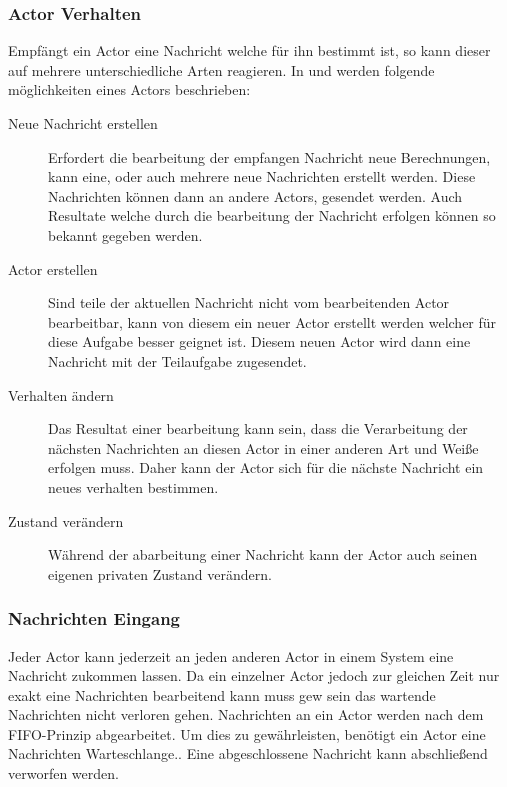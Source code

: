 \subsubsection{Actor Verhalten}
\label{actorBehaviour}
Empfängt ein Actor eine Nachricht welche für ihn bestimmt ist, so kann dieser auf mehrere unterschiedliche Arten reagieren. In \citep{Agha1985ActorsSystems} und \citep{Vernon2015ReactiveAkka} werden folgende möglichkeiten eines Actors beschrieben:
\begin{description}
    \item[Neue Nachricht erstellen] Erfordert die bearbeitung der empfangen Nachricht neue Berechnungen, kann eine, oder auch mehrere neue Nachrichten erstellt werden. Diese Nachrichten können dann an andere Actors, gesendet werden. Auch Resultate welche durch die bearbeitung der Nachricht erfolgen können so bekannt gegeben werden.
    \item[Actor erstellen] Sind teile der aktuellen Nachricht nicht vom bearbeitenden Actor bearbeitbar, kann von diesem ein neuer Actor erstellt werden welcher für diese Aufgabe besser geignet ist. Diesem neuen Actor wird dann eine Nachricht mit der Teilaufgabe zugesendet.
    \item[Verhalten ändern] Das Resultat einer bearbeitung kann sein, dass die Verarbeitung der nächsten Nachrichten an diesen Actor in einer anderen Art und Weiße erfolgen muss. Daher kann der Actor sich für die nächste Nachricht ein neues verhalten bestimmen.
    \item[Zustand verändern] Während der abarbeitung einer Nachricht kann der Actor auch seinen eigenen privaten Zustand verändern.
\end{description}

\subsubsection{Nachrichten Eingang}\label{actor:Mailbox}
Jeder Actor kann jederzeit an jeden anderen Actor in einem System eine Nachricht zukommen lassen. Da ein einzelner Actor jedoch zur gleichen Zeit nur exakt eine Nachrichten bearbeitend kann muss gew sein das wartende Nachrichten nicht verloren gehen. Nachrichten an ein Actor werden nach dem {FIFO-Prinzip} abgearbeitet. 
 Um dies zu gewährleisten, benötigt ein Actor eine Nachrichten Warteschlange.\citep{Agha1985ActorsSystems}. Eine abgeschlossene Nachricht kann abschließend verworfen werden. 


